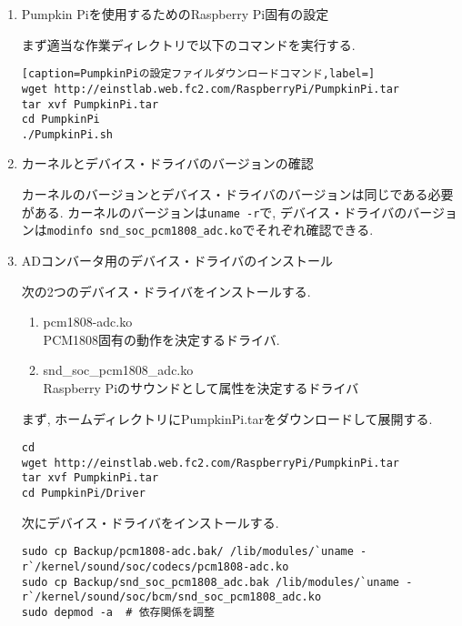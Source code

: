 \begin{enumerate}
\renewcommand{\labelenumi}{(\arabic{enumi})}
\item
  Pumpkin Piを使用するためのRaspberry Pi固有の設定

  まず適当な作業ディレクトリで以下のコマンドを実行する. 

\begin{lstlisting}[caption=PumpkinPiの設定ファイルダウンロードコマンド,label=]
wget http://einstlab.web.fc2.com/RaspberryPi/PumpkinPi.tar
tar xvf PumpkinPi.tar
cd PumpkinPi
./PumpkinPi.sh 
\end{lstlisting}
\item
  カーネルとデバイス・ドライバのバージョンの確認

  カーネルのバージョンとデバイス・ドライバのバージョンは同じである必要がある. カーネルのバージョンは\texttt{uname\ -r}で, デバイス・ドライバのバージョンは\texttt{modinfo\ snd\_soc\_pcm1808\_adc.ko}でそれぞれ確認できる. 

\item
  ADコンバータ用のデバイス・ドライバのインストール

  次の2つのデバイス・ドライバをインストールする. 

  \begin{enumerate}
  \def\labelenumii{\arabic{enumii}.}
  \tightlist
  \item
    pcm1808-adc.ko\\
    PCM1808固有の動作を決定するドライバ. 
  \item
    snd\_soc\_pcm1808\_adc.ko\\
    Raspberry Piのサウンドとして属性を決定するドライバ
  \end{enumerate}

  まず, ホームディレクトリにPumpkinPi.tarをダウンロードして展開する. 

\begin{lstlisting}[caption=デバイス・ドライバダウンロードコマンド,label=pumpkin_pi_donwload]
cd 
wget http://einstlab.web.fc2.com/RaspberryPi/PumpkinPi.tar
tar xvf PumpkinPi.tar
cd PumpkinPi/Driver
\end{lstlisting}

  次にデバイス・ドライバをインストールする. 

\begin{lstlisting}[caption=デバイス・ドライバのインストールコマンド,label=install_device_driver]
sudo cp Backup/pcm1808-adc.bak/ /lib/modules/`uname -r`/kernel/sound/soc/codecs/pcm1808-adc.ko
sudo cp Backup/snd_soc_pcm1808_adc.bak /lib/modules/`uname -r`/kernel/sound/soc/bcm/snd_soc_pcm1808_adc.ko
sudo depmod -a  # 依存関係を調整
\end{lstlisting}


\end{enumerate}
